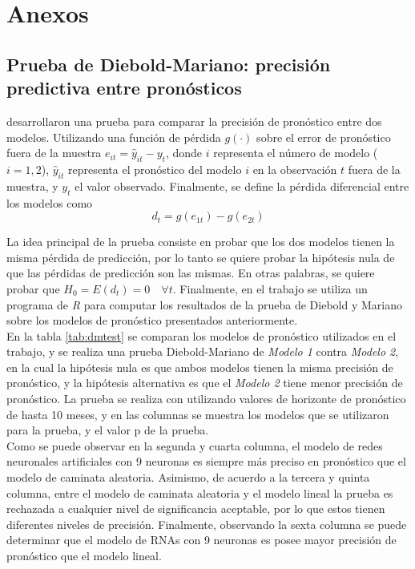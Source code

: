 \section*{Anexos}

\subsection*{Prueba de Diebold-Mariano: precisión predictiva entre pronósticos}

\textcite{diebold1995comparing} desarrollaron una prueba para comparar la precisión de pronóstico entre dos modelos. Utilizando una función de pérdida $g(\cdot)$ sobre el error de pronóstico fuera de la muestra $e_{it} = \hat{y}_{it} - y_{t}$, donde $i$ representa el número de modelo ($i = 1,2$), $\hat{y}_{it}$ representa el pronóstico del modelo $i$ en la observación $t$ fuera de la muestra, y $y_{t}$ el valor observado. Finalmente, se define la pérdida diferencial entre los modelos como \[ d_t = g(e_{1t}) - g(e_{2t}) \] 

La idea principal de la prueba consiste en probar que los dos modelos tienen la misma pérdida de predicción, por lo tanto se quiere probar la hipótesis nula de que las pérdidas de predicción son las mismas. En otras palabras, se quiere probar que $ H_0 = E(d_t) = 0 \quad \forall t $. Finalmente, en el trabajo se utiliza un programa de \textit{R} para computar los resultados de la prueba de Diebold y Mariano sobre los modelos de pronóstico presentados anteriormente.\\

En la tabla \ref{tab:dmtest} se comparan los modelos de pronóstico utilizados en el trabajo, y se realiza una prueba Diebold-Mariano de \textit{Modelo 1} contra \textit{Modelo 2}, en la cual la hipótesis nula es que ambos modelos tienen la misma precisión de pronóstico, y la hipótesis alternativa es que el \textit{Modelo 2} tiene menor precisión de pronóstico. La prueba se realiza con utilizando valores de horizonte de pronóstico de hasta 10 meses, y en las columnas se muestra los modelos que se utilizaron para la prueba, y el valor p de la prueba.\\

Como se puede observar en la segunda y cuarta columna, el modelo de redes neuronales artificiales con 9 neuronas es siempre más preciso en pronóstico que el modelo de caminata aleatoria. Asimismo, de acuerdo a la tercera y quinta columna, entre el modelo de caminata aleatoria y el modelo lineal la prueba es rechazada a cualquier nivel de significancia aceptable, por lo que estos tienen diferentes niveles de precisión. Finalmente, observando la sexta columna se puede determinar que el modelo de RNAs con 9 neuronas es posee mayor precisión de pronóstico que el modelo lineal.

